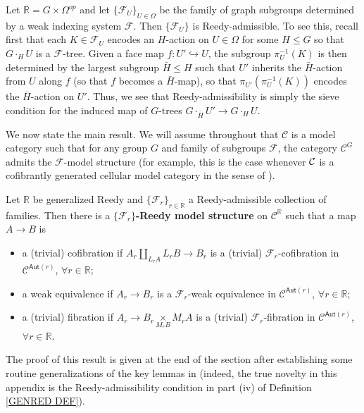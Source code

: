 \documentclass[a4paper,10pt,draft]{article}%
\numberwithin{equation}{section}%
\begin{document}
\begin{example}
	Let $\mathbb{R} = G \times \Omega^{op}$ and let
	$\{\mathcal{F}_U\}_{U \in \Omega}$ be the family of graph subgroups determined by a weak indexing system $\mathcal{F}$.
	Then $\{\mathcal{F}_U\}$ is Reedy-admissible.
	To see this, recall first that each $K \in \mathcal{F}_U$ encodes 
	an $H$-action on $U \in \Omega$ for some $H \leq G$
	so that $G \cdot_H U$ is a $\mathcal{F}$-tree.
	Given a face map $f \colon U' \hookrightarrow U$, 
	the subgroup $\pi^{-1}_U(K)$ is then determined by the largest subgroup $\bar{H}\leq H$ such that 
	$U'$ inherits the $\bar{H}$-action from $U$ along $f$ (so that $f$ becomes a $\bar{H}$-map), 
	so that $\pi_{U'}(\pi^{-1}_U(K))$ encodes the $\bar{H}$-action on $U'$. Thus, we see that Reedy-admissibility is simply the sieve condition for the induced map of $G$-trees
	$G \cdot_{\bar{H}} U' \to G \cdot_H U$.
\end{example}

We now state the main result.
We will assume throughout that $\mathcal{C}$ is a model category such that for any group $G$ and family of subgroups $\mathcal{F}$,
the category $\mathcal{C}^G$ admits the
$\mathcal{F}$-model structure
(for example, this is the case whenever $\mathcal{C}$ is a cofibrantly generated cellular model category in the sense of \cite{Ste16}).


\begin{theorem}\label{REEDYADM THM}
Let $\mathbb{R}$ be generalized Reedy and 
$\{\mathcal{F}_r\}_{r \in \mathbb{R}}$ a Reedy-admissible collection of families. 
Then there is a \textbf{$\{\mathcal{F}_r\}$-Reedy model structure} on
$\mathcal{C}^{\mathbb{R}}$ such that a map $A \to B$ is
\begin{itemize}
  \item a (trivial) cofibration if $A_r \underset{L_r A}{\coprod}L_r B \to B_r$ is a (trivial) $\mathcal{F}_r$-cofibration in $\mathcal{C}^{\mathsf{Aut}(r)}$, $\forall r \in \mathbb{R}$;
	\item a weak equivalence if $A_r \to B_r$ is a $\mathcal{F}_r$-weak equivalence in $\mathcal{C}^{\mathsf{Aut}(r)}$, $\forall r \in \mathbb{R}$;
	\item a (trivial) fibration if $A_r \to B_r \underset{M_r B}{\times }M_r A $ is a (trivial) $\mathcal{F}_r$-fibration in $\mathcal{C}^{\mathsf{Aut}(r)}$, $\forall r \in \mathbb{R}$.
\end{itemize}
\end{theorem}

The proof of this result is given at the end of the section after establishing some routine generalizations of the key lemmas in \cite{BM11}
(indeed, the true novelty in this appendix is the Reedy-admissibility condition in part (iv) of Definition \ref{GENRED DEF}).
\end{document}
